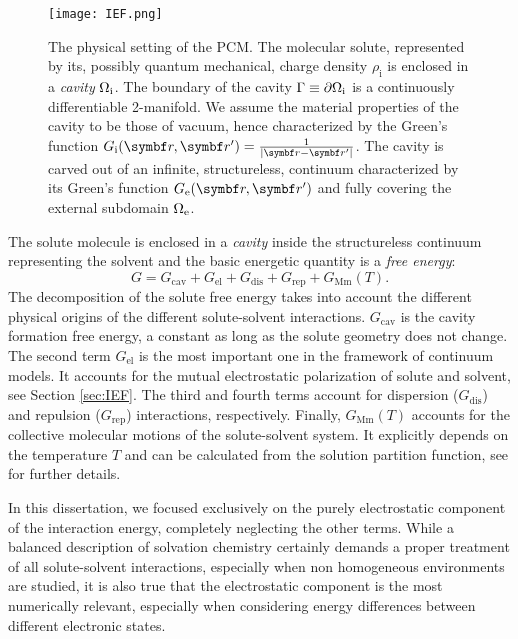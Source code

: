 \begin{figure}[!h]
  \centering
  \texttt{[image: IEF.png]}
  \caption[The physical setting of the polarizable continuum model.]{
  The physical setting of the \gls{PCM}. The molecular solute,
  represented by its, possibly quantum mechanical, charge density
  $\rho_\mathrm{i}$ is enclosed in a \emph{cavity} $\Omega_\mathrm{i}$.
  The boundary of the cavity $\Gamma\equiv\partial\Omega_\mathrm{i}$ is a
  continuously differentiable 2-manifold.
  We assume the material properties of the cavity to be those of vacuum,
  hence characterized by the Green's function
  $\Gi=\frac{1}{|\vect{r}-\vect{r}^\prime|}$.
  The cavity is carved out of an infinite, structureless, continuum
  characterized by its Green's function $\Ge$ and fully covering the
  external subdomain $\Omega_\mathrm{e}$.
  }
  \label{fig:IEF}
\end{figure}

The solute molecule is enclosed in a \emph{cavity} inside the
structureless continuum representing the solvent and the basic energetic
quantity is a \emph{free energy}:\autocite{Tomasi1994-gv,
Amovilli1998-pv, Tomasi2005-vm}
\begin{equation}\label{eq:free-energy}
 G = G_\mathrm{cav} + G_\mathrm{el} + G_\mathrm{dis} + G_\mathrm{rep} + G_\mathrm{Mm}(T).
\end{equation}
The decomposition of the solute free energy takes into account the
different physical origins of the different solute-solvent interactions.
$G_\mathrm{cav}$ is the cavity formation free energy, a constant as long
as the solute geometry does not change.\autocite{Tomasi1994-gv,
Floris1997-tu}
The second term $G_\mathrm{el}$ is the most important one in the
framework of continuum models. It accounts for the mutual electrostatic
polarization of solute and solvent, see Section \ref{sec:IEF}.
The third and fourth terms account for
dispersion ($G_\mathrm{dis}$) and repulsion ($G_\mathrm{rep}$) interactions,
respectively.\autocite{Amovilli1997-fo, Weijo2010-jy}
Finally, $G_\mathrm{Mm}(T)$ accounts for the collective molecular
motions of the solute-solvent system. It explicitly depends on the
temperature $T$ and can be calculated from the solution partition
function, see  for further details.

In this dissertation, we focused exclusively on the purely electrostatic
component of the interaction energy, completely neglecting the other
terms.
While a balanced description of solvation chemistry certainly demands
a proper treatment of all solute-solvent interactions, especially when
non homogeneous environments are studied,\autocite{Mozgawa2014-ad,
Mozgawa2016-wf} it is also true that the electrostatic component is the
most numerically relevant, especially when considering energy
differences between different electronic states.

